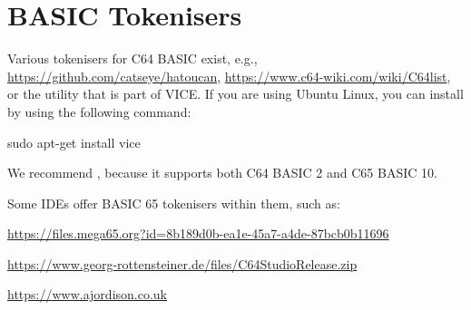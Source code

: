 \chapter{BASIC Tokenisers}

Various tokenisers for C64 BASIC exist, e.g., \url{https://github.com/catseye/hatoucan},
\url{https://www.c64-wiki.com/wiki/C64list}, or the  utility that is part of VICE.
If you are using Ubuntu Linux, you can install  by using the following command:

\begin{screencode}
sudo apt-get install vice
\end{screencode}

We recommend , because it supports both C64 BASIC 2 and C65 BASIC 10.

Some IDEs offer BASIC 65 tokenisers within them, such as:


\url{https://files.mega65.org?id=8b189d0b-ea1e-45a7-a4de-87bcb0b11696}


\url{https://www.georg-rottensteiner.de/files/C64StudioRelease.zip}


\url{https://www.ajordison.co.uk}
